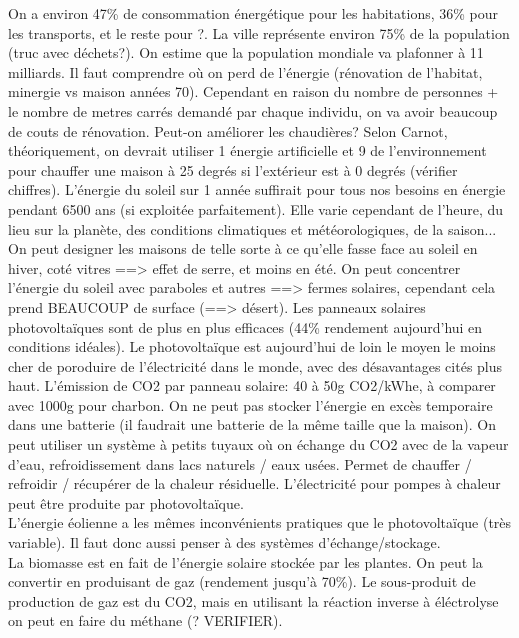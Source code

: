 \documentclass{Article}
\begin{document}
On a environ 47\% de consommation énergétique pour les habitations, 36\% pour les transports, et le reste pour ?. La ville représente environ 75\% de la population (truc avec déchets?). On estime que la population mondiale va plafonner à 11 milliards. Il faut comprendre où on perd de l'énergie (rénovation de l'habitat, minergie vs maison années 70). Cependant en raison du nombre de personnes + le nombre de metres carrés demandé par chaque individu, on va avoir beaucoup de couts de rénovation. Peut-on améliorer les chaudières? Selon Carnot, théoriquement, on devrait utiliser 1 énergie artificielle et 9 de l'environnement pour chauffer une maison à 25 degrés si l'extérieur est à 0 degrés (vérifier chiffres). L'énergie du soleil sur 1 année suffirait pour tous nos besoins en énergie pendant 6500 ans (si exploitée parfaitement). Elle varie cependant de l'heure, du lieu sur la planète, des conditions climatiques et météorologiques, de la saison... On peut designer les maisons de telle sorte à ce qu'elle fasse face au soleil en hiver, coté vitres ==> effet de serre, et moins en été. On peut concentrer l'énergie du soleil avec paraboles et autres ==> fermes solaires, cependant cela prend BEAUCOUP de surface (==> désert). Les panneaux solaires photovoltaïques sont de plus en plus efficaces (44\% rendement aujourd'hui en conditions idéales). Le photovoltaïque est aujourd'hui de loin le moyen le moins cher de poroduire de l'électricité dans le monde, avec des désavantages cités plus haut. L'émission de CO2 par panneau solaire: 40 à 50g CO2/kWhe, à comparer avec 1000g pour charbon. On ne peut pas stocker l'énergie en excès temporaire dans une batterie (il faudrait une batterie de la même taille que la maison). On peut utiliser un système à petits tuyaux où on échange du CO2 avec de la vapeur d'eau, refroidissement dans lacs naturels / eaux usées. Permet de chauffer / refroidir / récupérer de la chaleur résiduelle. L'électricité pour pompes à chaleur peut être produite par photovoltaïque. \\

 L'énergie éolienne a les mêmes inconvénients pratiques que le photovoltaïque (très variable). Il faut donc aussi penser à des systèmes d'échange/stockage.  \\

 La biomasse est en fait de l'énergie solaire stockée par les plantes. On peut la convertir en produisant de gaz (rendement jusqu'à 70\%). Le sous-produit de production de gaz est du CO2, mais en utilisant la réaction inverse à éléctrolyse on peut en faire du méthane (? VERIFIER).  \\
\end{document}
